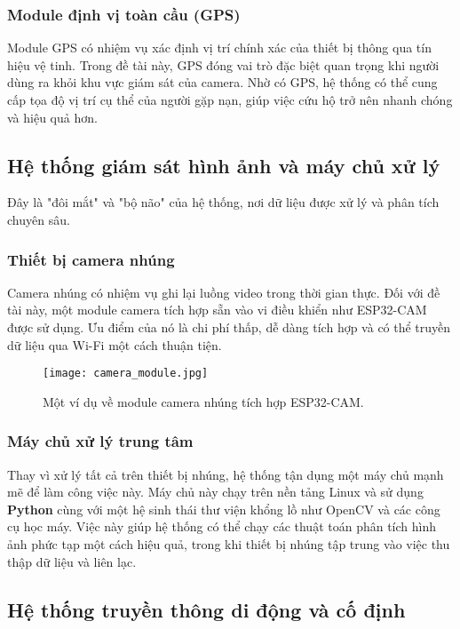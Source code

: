 \subsubsection{Module định vị toàn cầu (GPS)}
Module GPS có nhiệm vụ xác định vị trí chính xác của thiết bị thông qua tín hiệu vệ tinh. Trong đề tài này, GPS đóng vai trò đặc biệt quan trọng khi người dùng ra khỏi khu vực giám sát của camera. Nhờ có GPS, hệ thống có thể cung cấp tọa độ vị trí cụ thể của người gặp nạn, giúp việc cứu hộ trở nên nhanh chóng và hiệu quả hơn.

\subsection{Hệ thống giám sát hình ảnh và máy chủ xử lý}

Đây là "đôi mắt" và "bộ não" của hệ thống, nơi dữ liệu được xử lý và phân tích chuyên sâu.

\subsubsection{Thiết bị camera nhúng}
Camera nhúng có nhiệm vụ ghi lại luồng video trong thời gian thực. Đối với đề tài này, một module camera tích hợp sẵn vào vi điều khiển như ESP32-CAM được sử dụng. Ưu điểm của nó là chi phí thấp, dễ dàng tích hợp và có thể truyền dữ liệu qua Wi-Fi một cách thuận tiện.
\begin{figure}[h]
    \centering
    \texttt{[image: camera\_module.jpg]}
    \caption{Một ví dụ về module camera nhúng tích hợp ESP32-CAM.}
    \label{fig:esp32_cam}
\end{figure}

\subsubsection{Máy chủ xử lý trung tâm}
Thay vì xử lý tất cả trên thiết bị nhúng, hệ thống tận dụng một máy chủ mạnh mẽ để làm công việc này. Máy chủ này chạy trên nền tảng Linux và sử dụng \textbf{Python} cùng với một hệ sinh thái thư viện khổng lồ như OpenCV và các công cụ học máy. Việc này giúp hệ thống có thể chạy các thuật toán phân tích hình ảnh phức tạp một cách hiệu quả, trong khi thiết bị nhúng tập trung vào việc thu thập dữ liệu và liên lạc.

\subsection{Hệ thống truyền thông di động và cố định}

